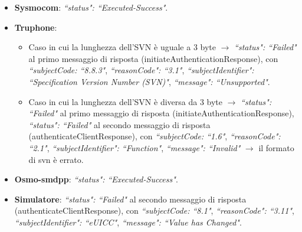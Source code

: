 \documentclass[10pt, oneside]{book}
\begin{document}
\begin{itemize}
\item \textbf{Sysmocom}: \textit{``status": ``Executed-Success"}.
\item \textbf{Truphone}:
\begin{itemize}
\item Caso in cui la lunghezza dell'SVN è uguale a 3 byte $\rightarrow$ \textit{``status": ``Failed"} al primo messaggio di risposta (initiateAuthenticationResponse), con \textit{``subjectCode: ``8.8.3"}, \textit{``reasonCode": ``3.1"}, \textit{``subjectIdentifier": ``Specification Version Number (SVN)"}, \textit{``message": ``Unsupported"}.
\item Caso in cui la lunghezza dell'SVN è diversa da 3 byte $\rightarrow$ \textit{``status": ``Failed"} al primo messaggio di risposta (initiateAuthenticationResponse), \textit{``status": ``Failed"} al secondo messaggio di risposta (authenticateClientResponse), con \textit{``subjectCode: ``1.6"}, \textit{``reasonCode": ``2.1"}, \textit{``subjectIdentifier": ``Function"}, \textit{``message": ``Invalid"} $\rightarrow$ il formato di svn è errato.
\end{itemize}
\item \textbf{Osmo-smdpp}: \textit{``status": ``Executed-Success"}.
\item \textbf{Simulatore}: \textit{``status": ``Failed"} al secondo messaggio di risposta (authenticateClientResponse), con \textit{``subjectCode: ``8.1"}, \textit{``reasonCode": ``3.11"}, \textit{``subjectIdentifier": ``eUICC"}, \textit{``message": ``Value has Changed"}.
\end{itemize}
\end{document}
